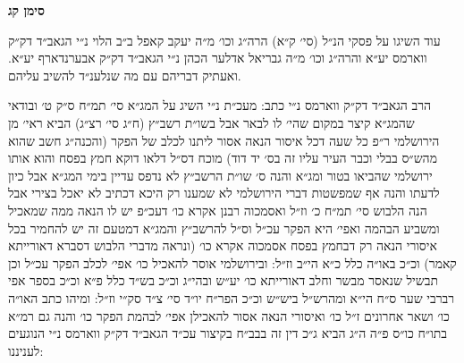 \documentclass[12pt, openany]{book}
\newcommand{\chapname}{}
\newcommand{\newchap}[1]{
	\addcontentsline{toc}{chapter}{#1}
	\renewcommand{\chapname}{#1}
		\begin{center}
			\textbf{%
\fontsize{16pt}{16pt}\selectfont
				#1}
		\end{center}
}
\begin{document}
\newchap{סימן קג}
\begin{multicols}{2}
עוד השיגו על פסקי הנ״ל (סי׳ ק״א) הרה״ג וכו׳ מ״ה יעקב קאפל ב״ב הלוי נ״י הגאב״ד דק״ק ווארמס יע״א והרה״ג וכו׳ מ״ה גבריאל אדלער הכהן נ״י הגאב״ד דק״ק אבערנדארף יע״א. ואעתיק דבריהם עם מה שנלענ״ד להשיב עליהם.\\\vspace{0pt}

הרב הגאב״ד דק״ק ווארמס נ״י כתב: מעכ״ת נ״י השיג על המג״א סי׳ תמ״ח ס״ק ט׳ ובודאי שהמג״א קיצר במקום שהי׳ לו לבאר אבל בשו״ת רשב״ץ (ח״ג סי׳ רצ״ג) הביא ראי׳ מן הירושלמי ר״פ כל שעה דכל איסור הנאה אסור ליתנו לכלב של הפקר (והכנה״ג חשב שהוא מהש״ס בבלי וכבר העיר עליו זה בס׳ יד דוד) מוכח דס״ל דלאו דוקא חמץ בפסח והוא אותו ירושלמי שהביאו בטור ומג״א והנה ס׳ שו״ת הרשב״ץ לא נדפס עדיין בימי המג״א אבל כיון לדעתו והנה אף שמפשטות דברי הירושלמי לא שמענו רק היכא דכתיב לא יאכל בצירי אבל הנה הלבוש סי׳ תמ״ח כ׳ וז״ל ואסמכוה רבנן אקרא כו׳ דעכ״פ יש לו הנאה ממה שמאכיל ומשביע הבהמה ואפי׳ היא הפקר עכ״ל וס״ל להרשב״ץ והמג״א דמטעם זה יש להחמיר בכל איסורי הנאה רק דבחמץ בפסח אסמכוה אקרא כו׳ (ונראה מדברי הלבוש דסברא דאורייתא קאמר) וכ״כ באו״ה כלל כ״א הי״ב וז״ל: ובירושלמי אוסר להאכיל כו׳ אפי׳ לכלב הפקר עכ״ל וכן תבשיל שנאסר מבשר וחלב דאורייתא כו׳ יע״ש ובהי״ג וכ״כ בש״ד כלל פ״א וכ״כ בספר אפי רברבי שער ס״ח הי״א ומהרש״ל ביש״ש וכ״כ הפר״ח יו״ד סי׳ צ״ד סק״י וז״ל: ומיהו כתב האו״ה כו׳ ושאר אחרונים ז״ל כו׳ ואיסורי הנאה אסור להאכילן אפי׳ לבהמת הפקר כו׳ והנה גם רמ״א בתו״ח כו״ס פ״ה ה״ג הביא ג״כ דין זה בבב״ח בקיצור עכ״ד הגאב״ד דק״ק ווארמס נ״י הנוגעים לעניננו:\\\vspace{0pt}


\end{multicols}
\end{document}
